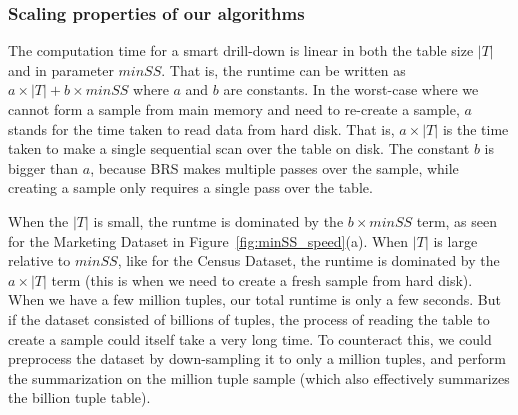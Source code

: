 \documentclass[10pt,journal,compsoc]{IEEEtran}
\begin{document}
\subsubsection{Scaling properties of our algorithms}
The computation time for a smart drill-down is linear in both the table size $|T|$ and in parameter $minSS$. That is, the runtime can be written as $a \times |T| + b \times minSS$ where $a$ and $b$ are constants. In the worst-case where we cannot form a sample from main memory and need to re-create a sample, $a$ stands for the time taken to read data from hard disk. That is, $a \times |T|$ is the time taken to make a single sequential scan over the table on disk. The constant $b$ is bigger than $a$, because BRS makes multiple passes over the sample, while creating a sample only requires a single pass over the table.

When the $|T|$ is small, the runtme is dominated by the $b \times minSS$ term, as seen for the Marketing Dataset in Figure~\ref{fig:minSS_speed}(a). When $|T|$ is large relative to $minSS$, like for the Census Dataset, the runtime is dominated by the $a \times |T|$ term (this is when we need to create a fresh sample from hard disk). When we have a few million tuples, our total runtime is only a few seconds. But if the dataset consisted of billions of tuples, the process of reading the table to create a sample could itself take a very long time. To counteract this, we could preprocess the dataset by down-sampling it to only a million tuples, and perform the summarization on the million tuple sample (which also effectively summarizes the billion tuple table).
\end{document}
